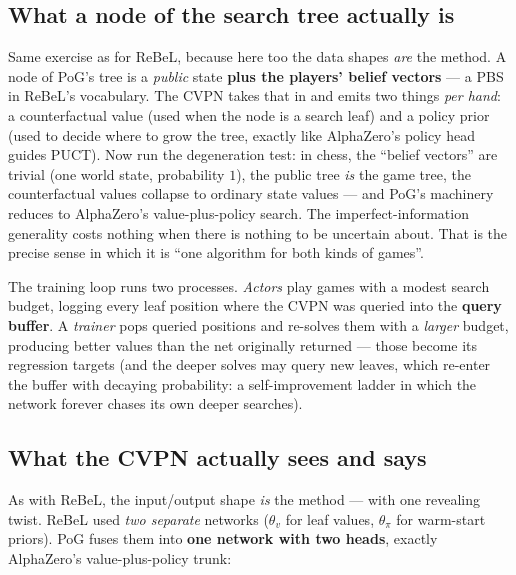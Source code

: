 \documentclass[11pt,a4paper]{article}
\begin{document}
\subsection{What a node of the search tree actually is}

Same exercise as for ReBeL, because here too the data shapes \emph{are} the
method. A node of PoG's tree is a \emph{public} state \textbf{plus the
players' belief vectors} --- a PBS in ReBeL's vocabulary. The CVPN takes
that in and emits two things \emph{per hand}: a counterfactual value (used
when the node is a search leaf) and a policy prior (used to decide where to
grow the tree, exactly like AlphaZero's policy head guides PUCT). Now run
the degeneration test: in chess, the ``belief vectors'' are trivial (one
world state, probability $1$), the public tree \emph{is} the game tree, the
counterfactual values collapse to ordinary state values --- and PoG's
machinery reduces to AlphaZero's value-plus-policy search. The
imperfect-information generality costs nothing when there is nothing to be
uncertain about. That is the precise sense in which it is ``one algorithm
for both kinds of games''.

The training loop runs two processes. \emph{Actors} play games with a modest
search budget, logging every leaf position where the CVPN was queried into
the \textbf{query buffer}. A \emph{trainer} pops queried positions and
re-solves them with a \emph{larger} budget, producing better values than the
net originally returned --- those become its regression targets (and the
deeper solves may query new leaves, which re-enter the buffer with decaying
probability: a self-improvement ladder in which the network forever chases
its own deeper searches).

\subsection{What the CVPN actually sees and says}

As with ReBeL, the input/output shape \emph{is} the method --- with one revealing
twist. ReBeL used \emph{two separate} networks ($\theta_v$ for leaf values,
$\theta_\pi$ for warm-start priors). PoG fuses them into \textbf{one network with
two heads}, exactly AlphaZero's value-plus-policy trunk:
\end{document}
